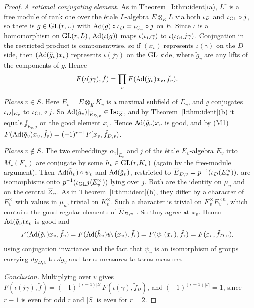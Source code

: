 \begin{proof}
\emph{A rational conjugating element.} As in Theorem~\ref{I:thm:ident}(a), $L^r$ is a free module of rank one over the \'etale $L$-algebra $E\otimes_KL$ via both $\iota_D$ and $\iota_{\mathrm{GL}}\circ j$, so there is $g\in\mathrm{GL}(r,L)$ with $\operatorname{Ad}(g)\circ\iota_D=\iota_{\mathrm{GL}}\circ j$ on $E$. Since $\iota$ is a homomorphism on $\mathrm{GL}(r,L)$, $\operatorname{Ad}(\iota(g))$ maps $\iota(\iota_D\gamma)$ to $\iota(\iota_{\mathrm{GL}} j\gamma)$. Conjugation in the restricted product is componentwise, so if $(x_v)$ represents $\iota(\gamma)$ on the $D$ side, then $(\operatorname{Ad}(\tilde g_v)x_v)$ represents $\iota(j\gamma)$ on the $\mathrm{GL}$ side, where $\tilde g_v$ are any lifts of the components of $g$. Hence
\[ F(\iota(j\gamma),\tilde f)=\prod_vF(\operatorname{Ad}(\tilde g_v)x_v,\tilde f_v). \]

\emph{Places $v\in S$.} Here $E_v=E\otimes_KK_v$ is a maximal subfield of $D_v$, and $g$ conjugates $\iota_D|_{E_v}$ to $\iota_{\mathrm{GL}}\circ j$. So $\operatorname{Ad}(\tilde g_v)|_{\overline{E}_{D,v}}\in\operatorname{Iso}_{\overline{Z}}$, and by Theorem~\ref{I:thm:ident}(b) it equals $\jj_{E_v,j}$ on the good element $x_v$. Hence $\operatorname{Ad}(\tilde g_v)x_v$ is good, and by (M1) $F(\operatorname{Ad}(\tilde g_v)x_v,\tilde f_v)=(-1)^{r-1}F(x_v,\tilde f_{D,v})$.

\emph{Places $v\notin S$.} The two embeddings $\alpha_v|_{E_v}$ and $j$ of the \'etale $K_v$-algebra $E_v$ into $M_r(K_v)$ are conjugate by some $h_v\in\mathrm{GL}(r,K_v)$ (again by the free-module argument). Then $\operatorname{Ad}(\tilde h_v)\circ\psi_v$ and $\operatorname{Ad}(\tilde g_v)$, restricted to $\overline{E}_{D,v}=p^{-1}(\iota_D(E_v^\times))$, are isomorphisms onto $p^{-1}(\iota_{\mathrm{GL}} j(E_v^\times))$ lying over $j$. Both are the identity on $\mu_n$ and on the central $\overline{Z}_v$. As in Theorem~\ref{I:thm:ident}(b), they differ by a character of $E_v^\times$ with values in $\mu_n$, trivial on $K_v^\times$. Such a character is trivial on $K_v^\times E_v^{\times n}$, which contains the good regular elements of $\overline{E}_{D,v}$ \cite[\S3, Proposition]{FK86} \Ev. So they agree at $x_v$. Hence $\operatorname{Ad}(\tilde g_v)x_v$ is good and
\[ F(\operatorname{Ad}(\tilde g_v)x_v,\tilde f_v)=F(\operatorname{Ad}(\tilde h_v)\psi_v(x_v),\tilde f_v)=F(\psi_v(x_v),\tilde f_v)=F(x_v,\tilde f_{D,v}), \]
using conjugation invariance and the fact that $\psi_v$ is an isomorphism of groups carrying $dg_{D,v}$ to $dg_v$ and torus measures to torus measures.

\emph{Conclusion.} Multiplying over $v$ gives $F(\iota(j\gamma),\tilde f)=(-1)^{(r-1)|S|}F(\iota(\gamma),\tilde f_D)$, and $(-1)^{(r-1)|S|}=1$, since $r-1$ is even for odd $r$ and $|S|$ is even for $r=2$.
\end{proof}


